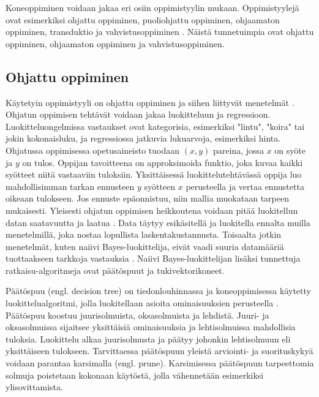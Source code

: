 \documentclass[utf8]{gradu3}
\begin{document}
Koneoppiminen voidaan jakaa eri osiin oppimistyylin mukaan. Oppimistyylejä ovat esimerkiksi ohjattu oppiminen, puoliohjattu oppiminen, ohjaamaton oppiminen, transduktio ja vahvistusoppiminen \parencite{das2017survey}. Näistä tunnetuimpia ovat ohjattu oppiminen, ohjaamaton oppiminen ja vahvistusoppiminen.

\subsection{Ohjattu oppiminen}

Käytetyin oppimistyyli on ohjattu oppiminen ja siihen liittyvät menetelmät \parencite{jordan2015machine,nasteski2017overview}. Ohjatun oppimisen tehtävät voidaan jakaa luokitteluun ja regressioon. Luokitteluongelmissa vastaukset ovat kategorisia, esimerkiksi "lintu", "koira" tai jokin kokonaisluku, ja regressiossa jatkuvia lukuarvoja, esimerkiksi hinta. Ohjatussa oppimisessa opetusaineisto tuodaan \((x,y)\) pareina, jossa \(x\) on syöte ja \(y\) on tulos. Oppijan tavoitteena on approksimoida funktio, joka kuvaa kaikki syötteet niitä vastaaviin tuloksiin. Yksittäisessä luokittelutehtävässä oppija luo mahdollisimman tarkan ennusteen \(y\) syötteen \(x\) perusteella ja vertaa ennustetta oikeaan tulokseen. Jos ennuste epäonnistuu, niin mallia muokataan tarpeen mukaisesti. Yleisesti ohjatun oppimisen heikkoutena voidaan pitää luokitellun datan saatavuutta ja laatua \parencite{das2017survey}. Data täytyy esikäsitellä ja luokitella ennalta muilla menetelmillä, joka nostaa lopullista laskentakustannusta. Toisaalta jotkin menetelmät, kuten naiivi Bayes-luokittelija, eivät vaadi suuria datamääriä tuottaakseen tarkkoja vastauksia \parencite{osisanwo2017supervised}. Naiivi Bayes-luokittelijan lisäksi tunnettuja ratkaisu-algoritmeja ovat päätöspuut ja tukivektorikoneet.

Päätöspuu (engl. decision tree) on tiedonlouhinnassa ja koneoppimisessa käytetty luokittelualgoritmi, jolla luokitellaan asioita ominaisuuksien perusteella \parencite{nasteski2017overview,osisanwo2017supervised}. Päätöspuu koostuu juurisolmuista, oksasolmuista ja lehdistä. Juuri- ja oksasolmuissa sijaitsee yksittäisiä ominaisuuksia ja lehtisolmuissa mahdollisia tuloksia. Luokittelu alkaa juurisolmusta ja päätyy johonkin lehtisolmuun eli yksittäiseen tulokseen. Tarvittaessa päätöspuun yleistä arviointi- ja suorituskykyä voidaan parantaa karsimalla (engl. prune). Karsimisessa päätöspuun tarpeettomia solmuja poistetaan kokonaan käytöstä, jolla vähennetään esimerkiksi ylisovittamista.
\end{document}
